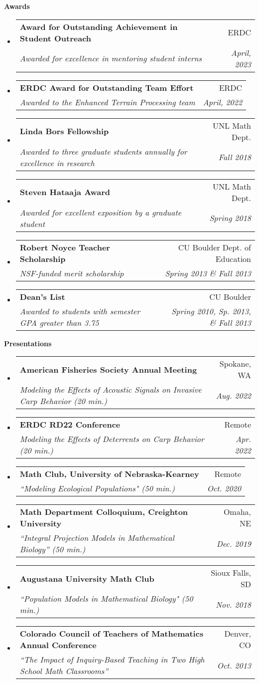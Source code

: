 \documentclass[letterpaper,11pt]{article}
\makeatletter
\newcommand{\resheading}[1]{{\large \colorbox{mygrey}{\begin{minipage}{\textwidth}{\textbf{#1 \vphantom{p\^{E}}}}\end{minipage}}}}
\newcommand{\ressubheading}[4]{
\begin{tabular*}{6.5in}{l@{\extracolsep{\fill}}r}
		\textbf{#1} & #2 \\
		\textit{#3} & \textit{#4} \\
\end{tabular*}\vspace{-6pt}}
\makeatother
\begin{document}
\resheading{Awards}
\begin{itemize}
	\item 
	\ressubheading{Award for Outstanding Achievement in Student Outreach}{ERDC}{Awarded for excellence in mentoring student interns}{April, 2023}
	\item
	\ressubheading{ERDC Award for Outstanding Team Effort}{ERDC}{Awarded to the Enhanced Terrain Processing team}{April, 2022}
	\item
	\ressubheading{Linda Bors Fellowship}{UNL Math Dept.}{Awarded to three graduate students annually for excellence in research}{Fall 2018}
	\item
	\ressubheading{Steven Hataaja Award}{UNL Math Dept.}{Awarded for excellent exposition by a graduate student}{Spring 2018}
	\item
	\ressubheading{Robert Noyce Teacher Scholarship}{CU Boulder Dept. of Education}{NSF-funded merit scholarship}{Spring 2013 \& Fall 2013}
	\item
	\ressubheading{Dean's List}{CU Boulder}{Awarded to students with semester GPA greater than 3.75}{Spring 2010, Sp. 2013, \& Fall 2013}
\end{itemize}

\begin{samepage}
	\resheading{Presentations}
	\begin{itemize}
		\item 
		\ressubheading{American Fisheries Society Annual Meeting}{Spokane, WA}{Modeling the Effects of Acoustic Signals on Invasive Carp Behavior (20 min.)}{Aug. 2022}
		\item
		\ressubheading{ERDC RD22 Conference}{Remote}{Modeling the Effects of Deterrents on Carp Behavior (20 min.)}{Apr. 2022}
		\item
		\ressubheading{Math Club, University of Nebraska-Kearney}{Remote}{``Modeling Ecological Populations" (50 min.)}{Oct. 2020}
		\item
		\ressubheading{Math Department Colloquium, Creighton University}{Omaha, NE}{``Integral Projection Models in Mathematical Biology'' (50 min.)}{Dec. 2019}
		\item
		\ressubheading{Augustana University Math Club}{Sioux Falls, SD}{``Population Models in Mathematical Biology" (50 min.)}{Nov. 2018}
		\item
		\ressubheading{Colorado Council of Teachers of Mathematics Annual Conference}{Denver, CO}{``The Impact of Inquiry-Based Teaching in Two High School Math Classrooms''}{Oct. 2013}
	\end{itemize}
\end{samepage}
	
\end{document}
